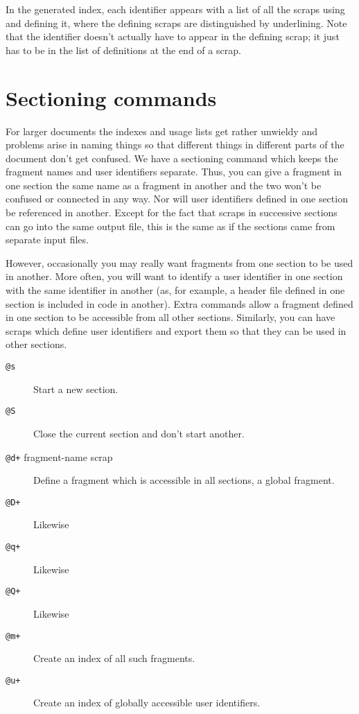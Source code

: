 \documentclass[a4paper]{report}
\begin{document}
In the generated index, each identifier appears with a list of all the
scraps using and defining it, where the defining scraps are
distinguished by underlining. Note that the identifier doesn't
actually have to appear in the defining scrap; it just has to be in
the list of definitions at the end of a scrap.

\section{Sectioning commands}
For larger documents the indexes and usage lists get rather
unwieldy and problems arise in naming things so that different
things in different parts of the document don't get confused. We
have a sectioning command which keeps the fragment names and user
identifiers separate. Thus, you can give a fragment in one section
the same name as a fragment in another and the two won't be confused
or connected in any way. Nor will user identifiers
defined in one section be referenced in another. Except for the
fact that scraps in successive sections can go into the same
output file, this is the same as if the sections came from
separate input files.

However, occasionally you may really want fragments from one section
to be used in another. More often, you will want to identify a
user identifier in one section with the same identifier in
another (as, for example, a header file defined in one section is
included in code in another). Extra commands allow a fragment
defined in one section to be accessible from all other sections.
Similarly, you can have scraps which define user identifiers and
export them so that they can be used in other sections.

\begin{description}
\item[{\tt @s}] Start a new section.
\item[{\tt @S}] Close the current section and don't start another.
\item[{\tt @d+} fragment-name scrap] Define a fragment which is
accessible in all sections, a global fragment.
\item[{\tt @D+}] Likewise
\item[{\tt @q+}] Likewise
\item[{\tt @Q+}] Likewise
\item[{\tt @m+}] Create an index of all such fragments.
\item[{\tt @u+}] Create an index of globally accessible
user identifiers.
\end{description}
\end{document}
